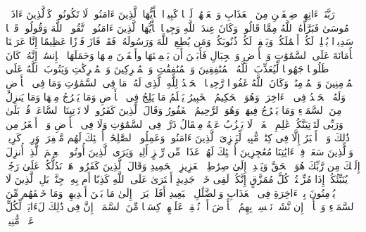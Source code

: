 \startbuffer[\q:33:68]
رَبَّنَاۤ ءَاتِهِمۡ ضِعۡفَیۡنِ مِنَ ٱلۡعَذَابِ وَٱلۡعَنۡهُمۡ لَعۡنࣰا كَبِیرࣰا%
\stopbuffer%
\startbuffer[\q:33:69]
یَٰۤأَیُّهَا ٱلَّذِینَ ءَامَنُوا۟ لَا تَكُونُوا۟ كَٱلَّذِینَ ءَاذَوۡا۟ مُوسَىٰ فَبَرَّأَهُ ٱللَّهُ مِمَّا قَالُوا۟ۚ وَكَانَ عِندَ ٱللَّهِ وَجِیهࣰا%
\stopbuffer%
\startbuffer[\q:33:70]
یَٰۤأَیُّهَا ٱلَّذِینَ ءَامَنُوا۟ ٱتَّقُوا۟ ٱللَّهَ وَقُولُوا۟ قَوۡلࣰا سَدِیدࣰا%
\stopbuffer%
\startbuffer[\q:33:71]
یُصۡلِحۡ لَكُمۡ أَعۡمَٰلَكُمۡ وَیَغۡفِرۡ لَكُمۡ ذُنُوبَكُمۡۗ وَمَن یُطِعِ ٱللَّهَ وَرَسُولَهُۥ فَقَدۡ فَازَ فَوۡزًا عَظِیمًا%
\stopbuffer%
\startbuffer[\q:33:72]
إِنَّا عَرَضۡنَا ٱلۡأَمَانَةَ عَلَى ٱلسَّمَٰوَٰتِ وَٱلۡأَرۡضِ وَٱلۡجِبَالِ فَأَبَیۡنَ أَن یَحۡمِلۡنَهَا وأَشۡفَقۡنَ مِنۡهَا وَحَمَلَهَا ٱلۡإِنسَٰنُۖ إِنَّهُۥ كَانَ ظَلُومࣰا جَهُولࣰا%
\stopbuffer%
\startbuffer[\q:33:73]
لِّیُعَذِّبَ ٱللَّهُ ٱلۡمُنَٰفِقِینَ وَٱلۡمُنَٰفِقَٰتِ وَٱلۡمُشۡرِكِینَ وَٱلۡمُشۡرِكَٰتِ وَیَتُوبَ ٱللَّهُ عَلَى ٱلۡمُؤۡمِنِینَ وَٱلۡمُؤۡمِنَٰتِۗ وَكَانَ ٱللَّهُ غَفُورࣰا رَّحِیمَۢا%
\stopbuffer%
\startbuffer[\q:34:1]
ٱلۡحَمۡدُ لِلَّهِ ٱلَّذِی لَهُۥ مَا فِی ٱلسَّمَٰوَٰتِ وَمَا فِی ٱلۡأَرۡضِ وَلَهُ ٱلۡحَمۡدُ فِی ٱلۡءَاخِرَةِۚ وَهُوَ ٱلۡحَكِیمُ ٱلۡخَبِیرُ%
\stopbuffer%
\startbuffer[\q:34:2]
یَعۡلَمُ مَا یَلِجُ فِی ٱلۡأَرۡضِ وَمَا یَخۡرُجُ مِنۡهَا وَمَا یَنزِلُ مِنَ ٱلسَّمَاۤءِ وَمَا یَعۡرُجُ فِیهَاۚ وَهُوَ ٱلرَّحِیمُ ٱلۡغَفُورُ%
\stopbuffer%
\startbuffer[\q:34:3]
وَقَالَ ٱلَّذِینَ كَفَرُوا۟ لَا تَأۡتِینَا ٱلسَّاعَةُۖ قُلۡ بَلَىٰ وَرَبِّی لَتَأۡتِیَنَّكُمۡ عَٰلِمِ ٱلۡغَیۡبِۖ لَا یَعۡزُبُ عَنۡهُ مِثۡقَالُ ذَرَّةࣲ فِی ٱلسَّمَٰوَٰتِ وَلَا فِی ٱلۡأَرۡضِ وَلَاۤ أَصۡغَرُ مِن ذَٰلِكَ وَلَاۤ أَكۡبَرُ إِلَّا فِی كِتَٰبࣲ مُّبِینࣲ%
\stopbuffer%
\startbuffer[\q:34:4]
لِّیَجۡزِیَ ٱلَّذِینَ ءَامَنُوا۟ وَعَمِلُوا۟ ٱلصَّٰلِحَٰتِۚ أُو۟لَٰۤئِكَ لَهُم مَّغۡفِرَةࣱ وَرِزۡقࣱ كَرِیمࣱ%
\stopbuffer%
\startbuffer[\q:34:5]
وَٱلَّذِینَ سَعَوۡ فِیۤ ءَایَٰتِنَا مُعَٰجِزِینَ أُو۟لَٰۤئِكَ لَهُمۡ عَذَابࣱ مِّن رِّجۡزٍ أَلِیمࣱ%
\stopbuffer%
\startbuffer[\q:34:6]
وَیَرَى ٱلَّذِینَ أُوتُوا۟ ٱلۡعِلۡمَ ٱلَّذِیۤ أُنزِلَ إِلَیۡكَ مِن رَّبِّكَ هُوَ ٱلۡحَقَّ وَیَهۡدِیۤ إِلَىٰ صِرَٰطِ ٱلۡعَزِیزِ ٱلۡحَمِیدِ%
\stopbuffer%
\startbuffer[\q:34:7]
وَقَالَ ٱلَّذِینَ كَفَرُوا۟ هَلۡ نَدُلُّكُمۡ عَلَىٰ رَجُلࣲ یُنَبِّئُكُمۡ إِذَا مُزِّقۡتُمۡ كُلَّ مُمَزَّقٍ إِنَّكُمۡ لَفِی خَلۡقࣲ جَدِیدٍ%
\stopbuffer%
\startbuffer[\q:34:8]
أَفۡتَرَىٰ عَلَى ٱللَّهِ كَذِبًا أَم بِهِۦ جِنَّةُۢۗ بَلِ ٱلَّذِینَ لَا یُؤۡمِنُونَ بِٱلۡءَاخِرَةِ فِی ٱلۡعَذَابِ وَٱلضَّلَٰلِ ٱلۡبَعِیدِ%
\stopbuffer%
\startbuffer[\q:34:9]
أَفَلَمۡ یَرَوۡا۟ إِلَىٰ مَا بَیۡنَ أَیۡدِیهِمۡ وَمَا خَلۡفَهُم مِّنَ ٱلسَّمَاۤءِ وَٱلۡأَرۡضِۚ إِن نَّشَأۡ نَخۡسِفۡ بِهِمُ ٱلۡأَرۡضَ أَوۡ نُسۡقِطۡ عَلَیۡهِمۡ كِسَفࣰا مِّنَ ٱلسَّمَاۤءِۚ إِنَّ فِی ذَٰلِكَ لَءَایَةࣰ لِّكُلِّ عَبۡدࣲ مُّنِیبࣲ%
